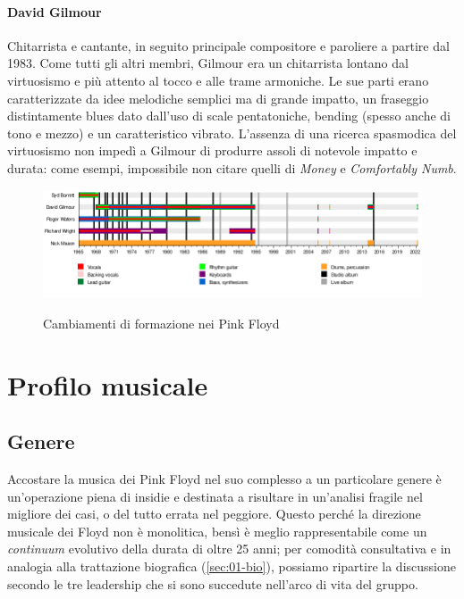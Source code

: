 \documentclass[class=book, crop=false, oneside, 12pt]{standalone}
\begin{document}
    \paragraph{David Gilmour}
    Chitarrista e cantante, in seguito principale compositore e paroliere a partire dal 1983. Come tutti gli altri membri, Gilmour era un chitarrista lontano dal virtuosismo e più attento al tocco e alle trame armoniche. Le sue parti erano caratterizzate da idee melodiche semplici ma di grande impatto, un fraseggio distintamente blues dato dall'uso di scale pentatoniche, bending (spesso anche di tono e mezzo) e un caratteristico vibrato. L'assenza di una ricerca spasmodica del virtuosismo non impedì a Gilmour di produrre assoli di notevole impatto e durata: come esempi, impossibile non citare quelli di \emph{Money} e \emph{Comfortably Numb}.

    \begin{figure}[H]
        \includegraphics[keepaspectratio, width=\textwidth]{assets/images/pinkfloyd-timeline.png}
        \label{fig:01-pinkfloyd-timeline}
        \caption{Cambiamenti di formazione nei Pink Floyd}
    \end{figure}
    
    \section{Profilo musicale}
    
    \subsection{Genere}
    Accostare la musica dei Pink Floyd nel suo complesso a un particolare genere è un'operazione piena di insidie e destinata a risultare in un'analisi fragile nel migliore dei casi, o del tutto errata nel peggiore. Questo perché la direzione musicale dei Floyd non è monolitica, bensì è meglio rappresentabile come un \emph{continuum} evolutivo della durata di oltre 25 anni; per comodità consultativa e in analogia alla trattazione biografica (\ref{sec:01-bio}), possiamo ripartire la discussione secondo le tre leadership che si sono succedute nell'arco di vita del gruppo.
\end{document}
